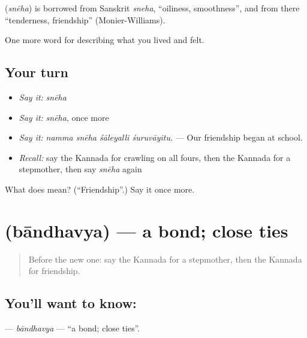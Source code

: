 \begin{cousinweb}
\textbf{} (\emph{snēha}) is borrowed from Sanskrit \emph{sneha}, \textquotedblleft{}oiliness, smoothness\textquotedblright{}, and from there \textquotedblleft{}tenderness, friendship\textquotedblright{} (Monier-Williams).
\end{cousinweb}

\begin{grammarlens}[title={What you've built}]
One more word for describing what you lived and felt.
\end{grammarlens}

\subsection*{Your turn}
\begin{itemize}
\raggedright
  \item \emph{Say it:} \emph{snēha}
  \item \emph{Say it:} \emph{snēha}, once more
  \item \emph{Say it:} \emph{namma snēha śāleyalli śuruvāyitu.} — Our friendship began at school.
  \item \emph{Recall:} say the Kannada for crawling on all fours, then the Kannada for a stepmother, then say \emph{snēha} again
\end{itemize}

\begin{tcolorbox}[breakable,colback=teal!4,colframe=teal!35!black,title={Before you move on}]
What does  mean? (\textquotedblleft{}Friendship\textquotedblright{}.) Say it once more.
\end{tcolorbox}
\section[\texorpdfstring{\kn{ಬಾಂಧವ್ಯ} (bāndhavya)}{ಬಾಂಧವ್ಯ (bāndhavya)}]{ (bāndhavya) — a bond; close ties}

\label{lesson:KA-C528-bandhavya}



\begin{quote}
Before the new one: say the Kannada for a stepmother, then the Kannada for friendship.
\end{quote}

\subsection*{You'll want to know: }
\textbf{} — \emph{bāndhavya} — \textquotedblleft{}a bond; close ties\textquotedblright{}.

